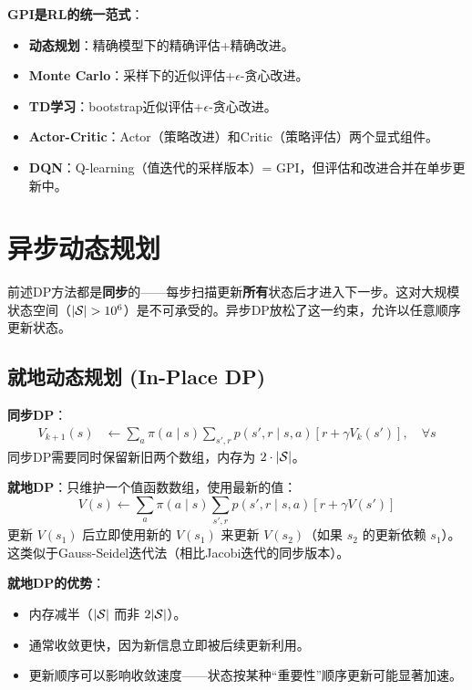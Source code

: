 \textbf{GPI是RL的统一范式}：
\begin{itemize}
    \item \textbf{动态规划}：精确模型下的精确评估+精确改进。
    \item \textbf{Monte Carlo}：采样下的近似评估+$\epsilon$-贪心改进。
    \item \textbf{TD学习}：bootstrap近似评估+$\epsilon$-贪心改进。
    \item \textbf{Actor-Critic}：Actor（策略改进）和Critic（策略评估）两个显式组件。
    \item \textbf{DQN}：Q-learning（值迭代的采样版本）= GPI，但评估和改进合并在单步更新中。
\end{itemize}

\section{异步动态规划}

前述DP方法都是\textbf{同步}的——每步扫描更新\textbf{所有}状态后才进入下一步。这对大规模状态空间（$|\mathcal{S}| > 10^6$）是不可承受的。异步DP放松了这一约束，允许以任意顺序更新状态。

\subsection{就地动态规划 (In-Place DP)}

\textbf{同步DP}：
\begin{align*}
V_{k+1}(s) &\leftarrow \sum_a \pi(a \mid s) \sum_{s', r} p(s', r \mid s, a) [r + \gamma V_k(s')], \quad \forall s
\end{align*}
同步DP需要同时保留新旧两个数组，内存为 $2 \cdot |\mathcal{S}|$。

\textbf{就地DP}：只维护一个值函数数组，使用最新的值：
\[
V(s) \leftarrow \sum_a \pi(a \mid s) \sum_{s', r} p(s', r \mid s, a) [r + \gamma V(s')]
\]
更新 $V(s_1)$ 后立即使用新的 $V(s_1)$ 来更新 $V(s_2)$（如果 $s_2$ 的更新依赖 $s_1$）。这类似于Gauss-Seidel迭代法（相比Jacobi迭代的同步版本）。

\textbf{就地DP的优势}：
\begin{itemize}
    \item 内存减半（$|\mathcal{S}|$ 而非 $2|\mathcal{S}|$）。
    \item 通常收敛更快，因为新信息立即被后续更新利用。
    \item 更新顺序可以影响收敛速度——状态按某种``重要性''顺序更新可能显著加速。
\end{itemize}

